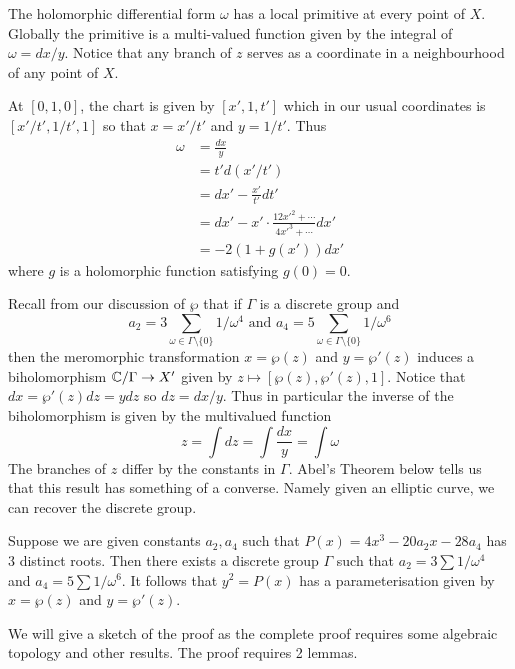 The holomorphic differential form $\omega$ has a local primitive at every point of $X$. Globally the primitive is a multi-valued function given by the integral of $\omega = dx/y$. Notice that any branch of $z$ serves as a coordinate in a neighbourhood of any point of $X$. 

At $[0, 1, 0]$, the chart is given by $[x', 1,t']$ which in our usual coordinates is $[x'/t', 1/t', 1]$ so that $x = x'/t'$ and $y = 1/t'$. Thus 
\begin{align*}
    \omega &= \frac{dx}{y}\\
    &= t' d(x'/t')\\
    &= dx' - \frac{x'}{t'}dt'\\
    &= dx' - x' \cdot \frac{12x'^2 + \cdots}{4x'^3 + \cdots} dx'\\
    &= -2 (1 + g(x')) dx'
\end{align*}
where $g$ is a holomorphic function satisfying $g(0) = 0$. 

Recall from our discussion of $\wp$ that if $\Gamma$ is a discrete group and 
$$a_2 = 3 \sum_{\omega \in \Gamma \setminus \{0\}} 1/\omega^4 \text{ and } a_4 = 5 \sum_{\omega \in \Gamma \setminus \{0\}} 1/\omega^6$$
then the meromorphic transformation $x = \wp(z)$ and $y = \wp'(z)$ induces a biholomorphism $\mathbb{C}/\Gamma \to X'$ given by $z \mapsto [\wp(z), \wp'(z), 1]$. Notice that $dx = \wp'(z)dz = y dz$ so $dz = dx/y$. Thus in particular the inverse of the biholomorphism is given by the multivalued function 
$$z = \int dz = \int \frac{dx}{y} = \int \omega $$
The branches of $z$ differ by the constants in $\Gamma$. Abel's Theorem below tells us that this result has something of a converse. Namely given an elliptic curve, we can recover the discrete group.

\begin{theorem}
    Suppose we are given constants $a_2, a_4$ such that $P(x) = 4x^3 - 20a_2 x - 28 a_4$ has 3 distinct roots. Then there exists a discrete group $\Gamma$ such that $a_2 = 3 \sum 1/\omega^4$ and $a_4 = 5 \sum 1/\omega^6$. It follows that $y^2 = P(x)$ has a parameterisation given by $x = \wp(z)$ and $y = \wp'(z)$. 
\end{theorem}

We will give a sketch of the proof as the complete proof requires some algebraic topology and other results. The proof requires 2 lemmas.

